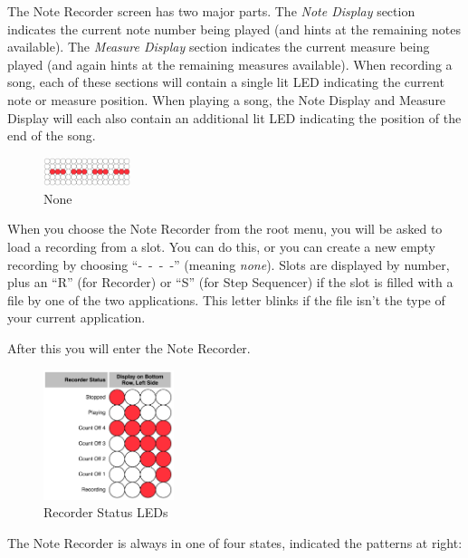\documentclass{article}
\begin{document}
The Note Recorder screen has two major parts.  The {\it Note Display} section indicates the current note number being played (and hints at the remaining notes available).  The {\it Measure Display} section indicates the current measure being played (and again hints at the remaining measures available).  When recording a song, each of these sections will contain a single lit LED indicating the current note or measure position.  When playing a song, the Note Display and Measure Display will each also contain an additional lit LED indicating the position of the end of the song.

\begin{figure}
\vspace{-1.5em}\includegraphics[width=1in]{none.pdf}
\vspace{-2em}\caption{\small None}\vspace{-1em}
\label{none}
\end{figure}

When you choose the Note Recorder from the root menu, you will be asked to load a recording from a slot.  You can do this, or you can create a new empty recording by choosing ``-~-~-~-'' (meaning {\it none}).  Slots are displayed by number, plus an ``R'' (for Recorder) or ``S'' (for Step Sequencer) if the slot is filled with a file by one of the two applications.  This letter blinks if the file isn't the type of your current application.

After this you will enter the Note Recorder.

\clearpage

\begin{figure}
\includegraphics[width=1.5in]{recorderstatus.pdf}
\vspace{-2em}\caption{\small Recorder Status LEDs}\vspace{-4em}
\label{recorderstatus}
\end{figure}

The Note Recorder is always in one of four states, indicated the patterns at right:
\end{document}
